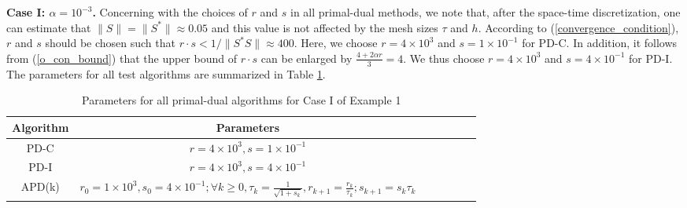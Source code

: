 \documentclass[final]{siamart171218}
\theoremstyle{remark}
\begin{document}
\medskip
\noindent\textbf{Case I: $\alpha=10^{-3}$.} Concerning with the choices of $r$ and $s$ in all primal-dual methods, we note that, after the space-time discretization, one can estimate that $\|S\| = \|S^*\| \approx 0.05$ and this value is not affected
by the mesh sizes $\tau$ and $h$. According to (\ref{convergence_condition}), $r$ and $s$ should be chosen such that $r\cdot s<1/\|S^*S\|\approx 400$. Here, we choose $r=4\times 10^3$ and $s=1\times10^{-1}$ for PD-C. In addition, it follows from (\ref{o_con_bound}) that the upper bound of $r\cdot s$ can be enlarged by $\frac{4+2\alpha r}{3}=4$. We thus choose $r=4\times 10^3$ and $s=4\times 10^{-1}$ for PD-I. The parameters for all test algorithms are summarized in Table \ref{parameter_case1_ex1}.
\begin{table}[htpb]
	\centering
	\caption{Parameters for all primal-dual algorithms for Case I of Example 1}\label{parameter_case1_ex1}
	{\footnotesize
		\begin{tabular}{|c|c|c|c|c|c|c|}
			\hline
			Algorithm&Parameters\\
			\hline
			PD-C& $r=4\times 10^3, s=1\times 10^{-1}$\\
			\hline
			PD-I& $r= 4\times 10^3, s=4\times 10^{-1}$\\
			\hline
			{APD}(k)& $r_0=1\times 10^3, s_0=4\times 10^{-1};\forall k\geq0, \tau_k=\frac{1}{\sqrt{1+s_k}}, r_{k+1}=\frac{r_k}{\tau_k}; s_{k+1}=s_k\tau_k$\\
			\hline
		\end{tabular}
	}
\end{table}
\end{document}
